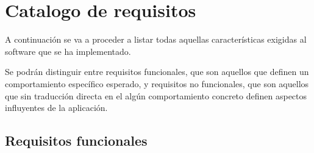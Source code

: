 \section{Catalogo de requisitos}

A continuación se va a proceder a listar todas aquellas características exigidas al software que se ha implementado.

Se podrán distinguir entre requisitos funcionales, que son aquellos que definen un comportamiento específico esperado, y requisitos no funcionales, que son aquellos que sin traducción directa en el algún comportamiento concreto definen aspectos influyentes de la aplicación.

\subsection{Requisitos funcionales}

